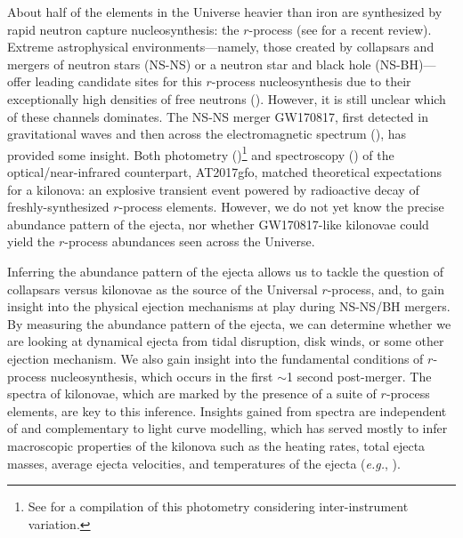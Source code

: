 \documentclass[twocolumn,twocolappendix]{aastex63}
\def\eg{{\it e.g.}}
\begin{document}
About half of the elements in the Universe heavier than iron are synthesized by rapid neutron capture nucleosynthesis: the $r$-process (see \citealt{cowan21} for a recent review). Extreme astrophysical environments---namely, those created by collapsars and mergers of neutron stars (NS-NS) or a neutron star and black hole (NS-BH)---offer leading candidate sites for this $r$-process nucleosynthesis due to their exceptionally high densities of free neutrons (\citealt{lattimer74, symbalisty82, eichler89, freiburghaus99, goriely11, korobkin12, bauswein13}). However, it is still unclear which of these channels dominates. The NS-NS merger GW170817, first detected in gravitational waves and then across the electromagnetic spectrum (\citealt{abbottLIGO17a, abbottLIGO17b}), has provided some insight. Both photometry (\citealt{andreoni17, arcavi17, coulter17, diaz17, drout17, evans17, hu17, kasliwal17, lipunov17, tanvir17, troja17, utsumi17, valenti17})\footnote{See \cite{villar17} for a compilation of this photometry considering inter-instrument variation.} and spectroscopy (\citealt{chornock17, kasen17, pian17, shappee17, smartt17}) of the optical/near-infrared counterpart, AT2017gfo, matched theoretical expectations for a kilonova: an explosive transient event powered by radioactive decay of freshly-synthesized $r$-process elements. However, we do not yet know the precise abundance pattern of the ejecta, nor whether GW170817-like kilonovae could yield the $r$-process abundances seen across the Universe. 

Inferring the abundance pattern of the ejecta allows us to tackle the question of collapsars versus kilonovae as the source of the Universal $r$-process, and, to gain insight into the physical ejection mechanisms at play during NS-NS/BH mergers. By measuring the abundance pattern of the ejecta, we can determine whether we are looking at dynamical ejecta from tidal disruption, disk winds, or some other ejection mechanism. We also gain insight into the fundamental conditions of $r$-process nucleosynthesis, which occurs in the first $\sim$1 second post-merger. The spectra of kilonovae, which are marked by the presence of a suite of $r$-process elements, are key to this inference. Insights gained from spectra are independent of and complementary to light curve modelling, which has served mostly to infer macroscopic properties of the kilonova such as the heating rates, total ejecta masses, average ejecta velocities, and temperatures of the ejecta (\eg, \citealt{villar17, almualla21, breschi21, ristic22}).
\end{document}
